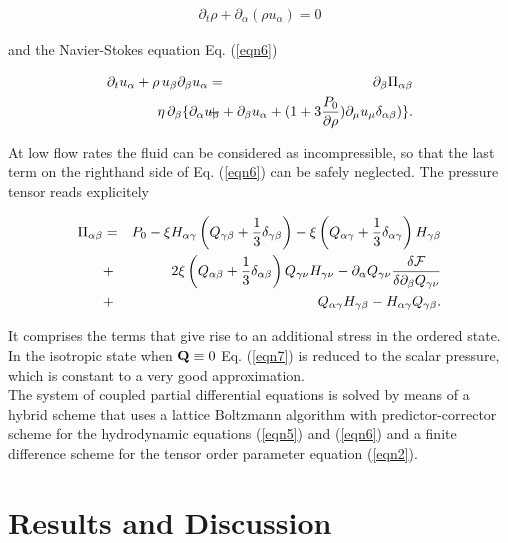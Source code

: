 \documentclass[aps,pre,onecolumn,groupedaddress]{revtex4-1}
\begin{document}
\begin{eqnarray}
\partial_t \rho + \partial_\alpha (\rho u_\alpha)=0
\label{eqn5}
\end{eqnarray}

and the Navier-Stokes equation Eq. (\ref{eqn6})

\begin{eqnarray}
\partial_t u_\alpha +\rho \,u_\beta \partial_\beta u_\alpha&=&\partial_\beta \Pi_{\alpha \beta}\nonumber\\
&+&\hspace*{-2cm}\eta\, \partial_\beta \{ \partial_\alpha u_\beta + \partial_\beta u_\alpha +(1+3\frac{P_0}{\partial \rho} )\partial_\mu u_\mu \delta_{\alpha \beta})\}. 
\label{eqn6}
\end{eqnarray}

At low flow rates the fluid can be considered as incompressible, so that the last term on the righthand side of Eq. (\ref{eqn6}) can be safely neglected.
The pressure tensor reads explicitely

\begin{eqnarray}
\Pi_{\alpha \beta}&=&P_0-\xi H_{\alpha \gamma}\left(Q_{\gamma \beta} +\frac{1}{3} \delta_{\gamma \beta}\right)-\xi \left(Q_{\alpha \gamma} +\frac{1}{3} \delta_{\alpha \gamma}\right) H_{\gamma \beta}\nonumber\\
&+& 2 \xi  \left(Q_{\alpha \beta} +\frac{1}{3} \delta_{\alpha \beta}\right) Q_{\gamma \nu} H_{\gamma \nu}-\partial_\alpha Q_{\gamma \nu} \frac{\delta{\cal F}}{\delta \partial_{\beta} Q_{\gamma \nu}}\nonumber\\
&+&Q_{\alpha \gamma}H_{\gamma \beta}-H_{\alpha \gamma} Q_{\gamma \beta}.
\label{eqn7}
\end{eqnarray}

It comprises the terms that give rise to an additional stress in the ordered state.
In the isotropic state when ${\bf Q}\equiv 0$ Eq. (\ref{eqn7}) is reduced to the scalar pressure, which is constant to a very good approximation.\\ 
The system of coupled partial differential equations is solved by means of a hybrid scheme \cite{Denniston:2004, Marenduzzo:2008} that uses a lattice Boltzmann algorithm with predictor-corrector scheme for the hydrodynamic equations (\ref{eqn5}) and (\ref{eqn6}) and a finite difference scheme for the tensor order parameter equation (\ref{eqn2}).


\section{Results and Discussion}
\end{document}

